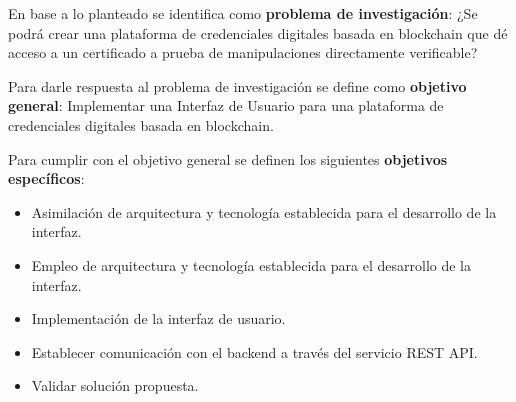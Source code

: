En base a lo planteado se identifica como \textbf{problema de investigaci\'on}: ¿Se podr\'a crear una plataforma de credenciales digitales basada en blockchain que d\'e acceso a un certificado a prueba de manipulaciones directamente verificable?\par

Para darle respuesta al problema de investigaci\'on se define como \textbf{objetivo general}: Implementar una Interfaz de Usuario para una plataforma de credenciales digitales basada en blockchain.

Para cumplir con el objetivo general se definen los siguientes \textbf{objetivos espec\'ificos}:
\begin{itemize}
\item Asimilaci\'on de arquitectura y tecnolog\'ia establecida para el desarrollo de la interfaz.
\item Empleo de arquitectura y tecnolog\'ia establecida para el desarrollo de la interfaz.
\item Implementaci\'on de la interfaz de usuario.
\item Establecer comunicaci\'on con el backend a trav\'es del servicio REST API.
\item Validar soluci\'on propuesta.
\end{itemize}
